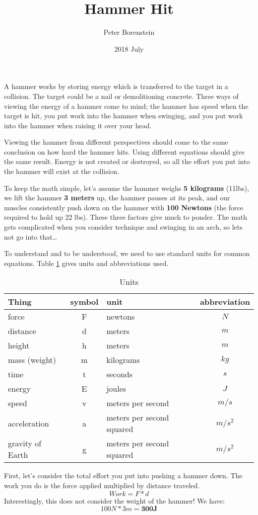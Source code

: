 \documentclass[11pt,a4paper]{article}
\title{Hammer Hit}
\author{Peter Borenstein}
\date{2018 July}
\begin{document}
\maketitle
A hammer works by storing energy which is transferred to the target in a collision.
The target could be a nail or demolitioning concrete.
Three ways of viewing the energy of a hammer come to mind;
the hammer has speed when the target is hit,
you put work into the hammer when swinging,
and you put work into the hammer when raising it over your head.

Viewing the hammer from different perspectives should come to the same conclusion on how hard the hammer hits.
Using different equations should give the same result.
Energy is not created or destroyed, so all the effort you put into the hammer will exist at the collision.

To keep the math simple, let's assume the hammer weighs \textbf{5 kilograms} (11lbs), we lift the hammer \textbf{3 meters} up, the hammer pauses at its peak, and our muscles consistently push down on the hammer with \textbf{100 Newtons} (the force required to hold up 22 lbs).
These three factors give much to ponder.
The math gets complicated when you consider technique and swinging in an arch, so lets not go into that\ldots

To understand and to be understood, we need to use standard units for common equations.
Table \ref{tab:units} gives units and abbreviations used.

\begin{table}
\noindent\begin{tabular}{l | c | l | c}
Thing&symbol&unit&abbreviation\\
\hline
force&F&newtons&$N$\\
distance&d&meters&$m$\\
height&h&meters&$m$\\
mass (weight)&m&kilograms&$kg$\\
time&t&seconds&$s$\\
energy&E&joules&$J$\\
speed&v&meters per second&$m/s$\\
acceleration&a&meters per second squared&$m/s^2$\\
gravity of Earth&g&meters per second squared&$m/s^2$\\
\end{tabular}
\label{tab:units}
\caption{Units}
\end{table}
\pagebreak

First, let's consider the total effort you put into pushing a hammer down.
The work you do is the force applied multiplied by distance traveled. $$Work = F*d$$
Interestingly, this does not consider the weight of the hammer! We have: $$100N*3m = \mathbf{300J}$$
\end{document}
